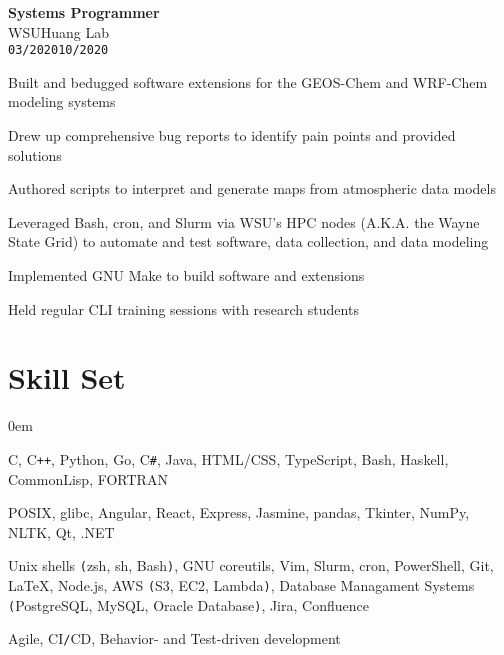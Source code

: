 \documentclass[10pt]{article}
\newenvironment{itemize*}%
  {\begin{itemize}[leftmargin=*,label=\faChevronRight]%
    \setlength{\itemsep}{0pt}%
    \setlength{\parskip}{0pt}%
    \setlength{\parsep}{0pt}}%
  {\end{itemize}}
\newcommand\workexp[5]{
    \begin{minipage}[t]{0.215\textwidth}
            \raggedleft
                \textbf{\fontsize{13}{10}\selectfont #1}\\ 
                #2\\
                \small\texttt{#3}\textendash \texttt{#4}
    \end{minipage}\hspace*{5pt}%
    \begin{minipage}[t]{0.75\textwidth}
        \raggedright
        \fontsize{10}{10}\selectfont#5
    \end{minipage}
}
\begin{document}
\workexp{Systems Programmer}{WSU\textendash Huang Lab}{03/2020}{10/2020}{%
    \begin{itemize*}
        \item Built and bedugged software extensions for the GEOS-Chem and WRF-Chem modeling systems
        \item Drew up comprehensive bug reports to identify pain points and provided solutions
        \item Authored scripts to interpret and generate maps from atmospheric data models
        \item Leveraged Bash, cron, and Slurm via WSU's HPC nodes (A.K.A. the Wayne State Grid) to automate and test software, 
              data collection, and data modeling
        \item Implemented GNU Make to build software and extensions
        \item Held regular CLI training sessions with research students
    \end{itemize*}%
}

\vspace*{-10pt}
\section*{Skill Set}
\vspace*{-8pt}\hspace*{10pt}\begin{minipage}{0.935\textwidth}
    \begin{description}
        \itemsep0em
        \raggedright
        \item[Languages] C, C\texttt{++}, Python, Go, C\texttt{\#}, Java, HTML/CSS, TypeScript, Bash, Haskell, CommonLisp, FORTRAN
        \item[Frameworks\texttt{/}Libraries] POSIX, glibc, Angular, React, Express, Jasmine, pandas, Tkinter, NumPy, NLTK,
            Qt, .NET
        \item[Tools] Unix shells \texttt{(}zsh, sh, Bash\texttt{)}, GNU coreutils, Vim, Slurm, cron, PowerShell, Git, \LaTeX, Node.js,
            AWS \texttt{(}S3, EC2, Lambda\texttt{)}, Database Managament Systems \texttt{(}PostgreSQL, MySQL, Oracle
            Database\texttt{)}, Jira, Confluence
        \item[Methodologies] Agile, CI\texttt{/}CD, Behavior- and Test-driven development
    \end{description}
\end{minipage}

\vspace*{-10pt}
\end{document}
